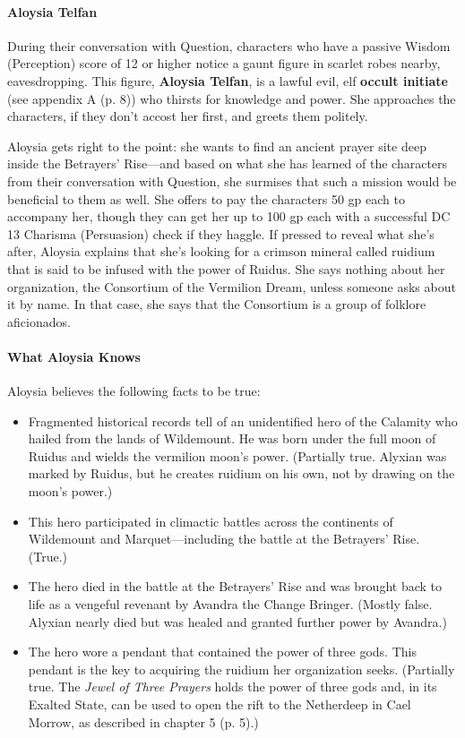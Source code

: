 \documentclass[letterpaper, 11pt, bg=full, twocolumn]{dndbook}
\begin{document}
\paragraph{Aloysia Telfan}

During their conversation with Question, characters who have a passive Wisdom (Perception) score of 12 or higher notice a gaunt figure in scarlet robes nearby, eavesdropping. This figure, \textbf{Aloysia Telfan}, is a lawful evil, elf \textbf{occult initiate} (see appendix A (p. 8)) who thirsts for knowledge and power. She approaches the characters, if they don't accost her first, and greets them politely.

Aloysia gets right to the point: she wants to find an ancient prayer site deep inside the Betrayers' Rise---and based on what she has learned of the characters from their conversation with Question, she surmises that such a mission would be beneficial to them as well. She offers to pay the characters 50 gp each to accompany her, though they can get her up to 100 gp each with a successful DC 13 Charisma (Persuasion) check if they haggle. If pressed to reveal what she's after, Aloysia explains that she's looking for a crimson mineral called ruidium that is said to be infused with the power of Ruidus. She says nothing about her organization, the Consortium of the Vermilion Dream, unless someone asks about it by name. In that case, she says that the Consortium is a group of folklore aficionados.

\paragraph{What Aloysia Knows}

Aloysia believes the following facts to be true:

\begin{itemize}
\item Fragmented historical records tell of an unidentified hero of the Calamity who hailed from the lands of Wildemount. He was born under the full moon of Ruidus and wields the vermilion moon's power. (Partially true. Alyxian was marked by Ruidus, but he creates ruidium on his own, not by drawing on the moon's power.)
\item This hero participated in climactic battles across the continents of Wildemount and Marquet---including the battle at the Betrayers' Rise. (True.)
\item The hero died in the battle at the Betrayers' Rise and was brought back to life as a vengeful revenant by Avandra the Change Bringer. (Mostly false. Alyxian nearly died but was healed and granted further power by Avandra.)
\item The hero wore a pendant that contained the power of three gods. This pendant is the key to acquiring the ruidium her organization seeks. (Partially true. The \textit{Jewel of Three Prayers} holds the power of three gods and, in its Exalted State, can be used to open the rift to the Netherdeep in Cael Morrow, as described in chapter 5 (p. 5).)
\end{itemize}
\end{document}
